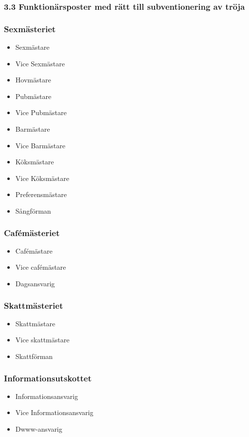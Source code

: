 \documentclass{dsekkallelse}
\begin{document}
\subsubsection{3.3 Funktionärsposter med rätt till subventionering av tröja}
\begin{multicols}{2}
  \subsubsection{Sexmästeriet}
    \begin{itemize}
      \item Sexmästare
      \item Vice Sexmästare
      \item Hovmästare
      \item Pubmästare
      \item Vice Pubmästare
      \item Barmästare
      \item Vice Barmästare
      \item Köksmästare
      \item Vice Köksmästare
      \item Preferensmästare
      \item Sångförman
  	\end{itemize}
  \subsubsection{Cafémästeriet}
    \begin{itemize}
      \item Cafémästare
      \item Vice cafémästare
      \item Dagsansvarig
    \end{itemize}
  \subsubsection{Skattmästeriet}
    \begin{itemize}
      \item Skattmästare
      \item Vice skattmästare
      \item Skattförman
    \end{itemize}
  \subsubsection{Informationsutskottet}
    \begin{itemize}
      \item Informationsansvarig
      \item Vice Informationsansvarig
      \item Dwww-ansvarig
    \end{itemize}

\end{multicols}
\end{document}
